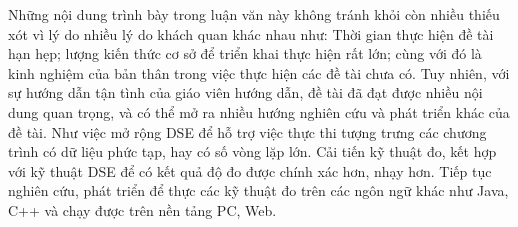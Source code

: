 Những nội dung trình bày trong luận văn này không tránh khỏi còn nhiều thiếu xót vì lý do nhiều lý do khách quan khác nhau như: Thời gian thực hiện đề tài hạn hẹp; lượng kiến thức cơ sở để triển khai thực hiện rất lớn; cùng với đó là kinh nghiệm của bản thân trong việc thực hiện các đề tài chưa có. Tuy nhiên, với sự hướng dẫn tận tình của giáo viên hướng dẫn, đề tài đã đạt được nhiều nội dung quan trọng, và có thể mở ra nhiều hướng nghiên cứu và phát triển khác của đề tài. Như việc mở rộng DSE để hỗ trợ việc thực thi tượng trưng các chương trình có dữ liệu phức tạp, hay có số vòng lặp lớn. Cải tiến kỹ thuật đo, kết hợp với kỹ thuật DSE để có kết quả độ đo được chính xác hơn, nhạy hơn. Tiếp tục nghiên cứu, phát triển để thực các kỹ thuật đo trên các ngôn ngữ khác như Java, C++ và chạy được trên nền tảng PC, Web. 

